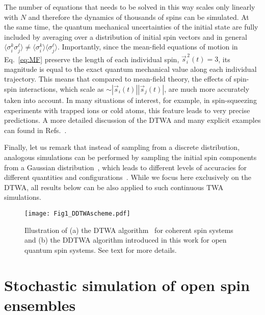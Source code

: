 \documentclass[pra,twocolumn,showpacs,preprintnumbers,amsmath,amssymb,superscriptaddress]{revtex4-1}
\begin{document}
The number of equations that needs to be solved in this way scales only linearly with $N$ and therefore the dynamics of thousands of spins can be simulated. At the same time, the quantum mechanical uncertainties of the initial state are fully included by averaging over a distribution of initial spin vectors and in general $\langle \sigma_i^k \sigma_j^\ell \rangle\neq \langle \sigma_i^k\rangle\langle \sigma_j^\ell \rangle$. Importantly, since the mean-field equations of motion in Eq.~\eqref{eq:MF} preserve the length of each individual spin, $\vec s^{\,2}_i(t)=3$, its magnitude is equal to the exact quantum mechanical value along each individual trajectory. This means that compared to mean-field theory, the effects of spin-spin interactions, which scale as $\sim |\vec s_i(t)| |\vec s_j(t)|$, are much more accurately taken into account. In many situations of interest, for example, in spin-squeezing experiments with trapped ions or cold atoms, this feature leads to very precise predictions.  A more detailed discussion of the DTWA and many explicit examples can found in Refs.~\cite{Schachenmayer2015,Khasseh2020,Czischek2018,Zhu2019,Perlin2020}.

Finally, let us remark that instead of sampling from a discrete distribution, analogous simulations can be performed by sampling the initial spin components from a Gaussian distribution~\cite{Polkovnikov2010}, which leads to different levels of accuracies for different quantities and configurations~\cite{Sundar2019}. While we focus here exclusively on the DTWA, all results below can be also applied to such continuous TWA simulations.


\begin{figure}[t]
	\centering
	\texttt{[image: Fig1\_DDTWAscheme.pdf]}
	\caption{Illustration of (a) the DTWA algorithm~\cite{Schachenmayer2015} for coherent spin systems and (b) the DDTWA algorithm introduced in this work for open quantum spin systems. See text for more details.}
	\label{fig:DDTWAscheme}
\end{figure}








\section{Stochastic simulation of open spin ensembles}\label{sec:stochastic}
\end{document}
